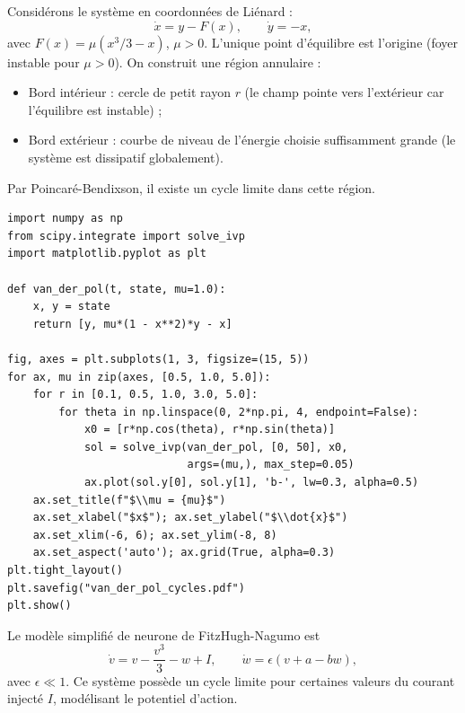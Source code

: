 \begin{exemple}
Consid\'erons le syst\`eme en coordonn\'ees de Li\'enard :
\[
    \dot{x} = y - F(x), \qquad \dot{y} = -x,
\]
avec $F(x) = \mu(x^3/3 - x)$, $\mu > 0$. L'unique point d'\'equilibre est
l'origine (foyer instable pour $\mu > 0$). On construit une r\'egion
annulaire :
\begin{itemize}
    \item Bord int\'erieur : cercle de petit rayon $r$ (le champ pointe vers
    l'ext\'erieur car l'\'equilibre est instable) ;
    \item Bord ext\'erieur : courbe de niveau de l'\'energie choisie suffisamment
    grande (le syst\`eme est dissipatif globalement).
\end{itemize}
Par Poincar\'e-Bendixson, il existe un cycle limite dans cette r\'egion.
\end{exemple}

\begin{codeblock}[title=\textbf{Cycle limite de Van der Pol}]
\begin{verbatim}
import numpy as np
from scipy.integrate import solve_ivp
import matplotlib.pyplot as plt

def van_der_pol(t, state, mu=1.0):
    x, y = state
    return [y, mu*(1 - x**2)*y - x]

fig, axes = plt.subplots(1, 3, figsize=(15, 5))
for ax, mu in zip(axes, [0.5, 1.0, 5.0]):
    for r in [0.1, 0.5, 1.0, 3.0, 5.0]:
        for theta in np.linspace(0, 2*np.pi, 4, endpoint=False):
            x0 = [r*np.cos(theta), r*np.sin(theta)]
            sol = solve_ivp(van_der_pol, [0, 50], x0,
                            args=(mu,), max_step=0.05)
            ax.plot(sol.y[0], sol.y[1], 'b-', lw=0.3, alpha=0.5)
    ax.set_title(f"$\\mu = {mu}$")
    ax.set_xlabel("$x$"); ax.set_ylabel("$\\dot{x}$")
    ax.set_xlim(-6, 6); ax.set_ylim(-8, 8)
    ax.set_aspect('auto'); ax.grid(True, alpha=0.3)
plt.tight_layout()
plt.savefig("van_der_pol_cycles.pdf")
plt.show()
\end{verbatim}
\end{codeblock}

\begin{exemple}
Le mod\`ele simplifi\'e de neurone de FitzHugh-Nagumo est
\[
    \dot{v} = v - \frac{v^3}{3} - w + I, \qquad
    \dot{w} = \epsilon(v + a - bw),
\]
avec $\epsilon \ll 1$. Ce syst\`eme poss\`ede un cycle limite pour certaines
valeurs du courant inject\'e $I$, mod\'elisant le potentiel d'action.
\end{exemple}

